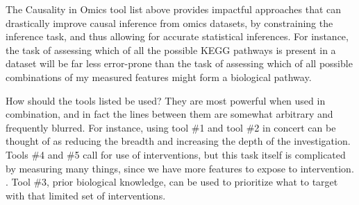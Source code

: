 \documentclass[]{article}
\begin{document}
The Causality in Omics tool list above provides impactful approaches
that can drastically improve causal inference from omics datasets, by
constraining the inference task, and thus allowing for accurate
statistical inferences. For instance, the task of assessing which of all
the possible KEGG pathways is present in a dataset will be far less
error-prone than the task of assessing which of all possible
combinations of my measured features might form a biological pathway.

How should the tools listed be used? They are most powerful when used in
combination, and in fact the lines between them are somewhat arbitrary
and frequently blurred. For instance, using tool \#1 and tool \#2 in
concert can be thought of as reducing the breadth and increasing the
depth of the investigation. Tools \#4 and \#5 call for use of
interventions, but this task itself is complicated by measuring many
things, since we have more features to expose to intervention. . Tool
\#3, prior biological knowledge, can be used to prioritize what to
target with that limited set of interventions.
\end{document}

